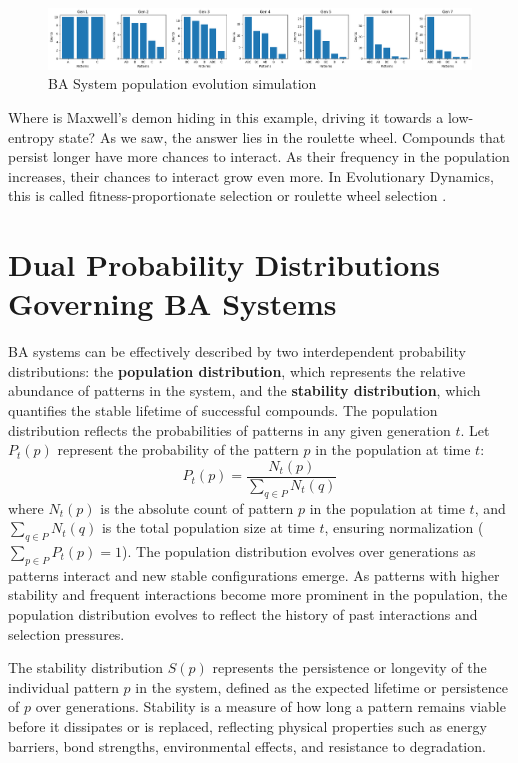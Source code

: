 \documentclass[entropy,article,submit,pdftex,moreauthors]{Definitions/mdpi}
\begin{document}
\begin{figure}[htp]
    \centering
    \includegraphics[width=13cm]{pat_1}
    \caption{BA System population evolution simulation}
    \label{fig:pat_1}
\end{figure}

Where is Maxwell's demon \cite{leff2002maxwell} hiding in this example, driving it towards a low-entropy state? As we saw, the answer lies in the roulette wheel. Compounds that persist longer have more chances to interact. As their frequency in the population increases, their chances to interact grow even more. In Evolutionary Dynamics, this is called fitness-proportionate selection \cite{back1996evolutionary} or roulette wheel selection \cite{goldberg1989genetic} \cite{holland1975adaptation}.

\section{Dual Probability Distributions Governing BA Systems}

BA systems can be effectively described by two interdependent probability distributions: the \textbf{population distribution}, which represents the relative abundance of patterns in the system, and the \textbf{stability distribution}, which quantifies the stable lifetime of successful compounds. The population distribution reflects the probabilities of patterns in any given generation \( t \). Let \( P_t(p) \) represent the probability of the pattern \( p \) in the population at time \( t \):
\[
P_t(p) = \frac{N_t(p)}{\sum_{q \in P} N_t(q)}
\]
where \( N_t(p) \) is the absolute count of pattern \( p \) in the population at time \( t \), and \( \sum_{q \in P} N_t(q) \) is the total population size at time \( t \), ensuring normalization (\( \sum_{p \in P} P_t(p) = 1 \)). The population distribution evolves over generations as patterns interact and new stable configurations emerge. As patterns with higher stability and frequent interactions become more prominent in the population, the population distribution evolves to reflect the history of past interactions and selection pressures.

The stability distribution \( S(p) \) represents the persistence or longevity of the individual pattern \( p \) in the system, defined as the expected lifetime or persistence of \( p \) over generations. Stability is a measure of how long a pattern remains viable before it dissipates or is replaced, reflecting physical properties such as energy barriers, bond strengths, environmental effects, and resistance to degradation.
\end{document}
